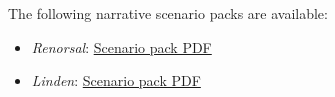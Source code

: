 The following narrative scenario packs are available:

\begin{itemize}

\item \emph{Renorsal}: \href{https://raw.githubusercontent.com/Eudicods/outworlds-wastes/rules-pdf/renorsal.pdf}{Scenario pack PDF}

\item \emph{Linden}: \href{https://raw.githubusercontent.com/Eudicods/outworlds-wastes/rules-pdf/linden.pdf}{Scenario pack PDF}

\end{itemize}
